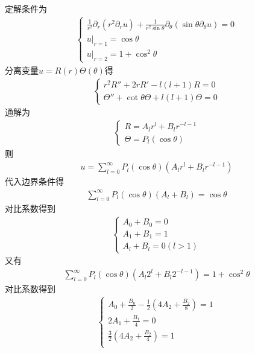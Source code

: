 \documentclass{phyasgn}
\begin{document}
\begin{sol}[5]
  定解条件为
  \begin{align*}
    \left\{\begin{matrix}
      \frac{1}{r^2}\partial_r(r^2\partial_r u)+\frac{1}{r^2\sin\theta}\partial_\theta(\sin\theta\partial_\theta u)=0\\
      u|_{r=1}=\cos\theta\\
      u|_{r=2}=1+\cos^2\theta
    \end{matrix}\right.
  \end{align*}
  分离变量$u=R(r)\Theta(\theta)$得
  \begin{align*}
    \left\{\begin{matrix}
      r^2R''+2rR'-l(l+1)R=0\\
      \Theta''+\cot\theta\Theta+l(l+1)\Theta=0
    \end{matrix}\right.
  \end{align*}
  通解为
  \begin{align*}
    \left\{\begin{matrix}
      R=A_lr^l+B_lr^{-l-1}\\
      \Theta=P_l(\cos\theta)
    \end{matrix}\right.
  \end{align*}
  则\begin{align*}
    u=\sum_{l=0}^{\infty}P_l(\cos\theta)(A_lr^l+B_lr^{-l-1})
  \end{align*}
  代入边界条件得
  \begin{align*}
    \sum_{l=0}^{\infty}P_l(\cos\theta)(A_l+B_l)=\cos\theta
  \end{align*}
  对比系数得到
  \begin{align*}
    \left\{\begin{matrix}
      A_0+B_0=0\\
    A_1+B_1=1\\
    A_l+B_l=0(l>1)
    \end{matrix}\right.
  \end{align*}
  又有
  \begin{align*}
    \sum_{l=0}^{\infty}P_l(\cos\theta)(A_l2^l+B_l2^{-l-1})=1+\cos^2\theta
  \end{align*}
  对比系数得到
  \begin{align*}
    \left\{\begin{matrix}
      A_0+\frac{B_0}{2}-\frac{1}{2}(4A_2+\frac{B_2}{8})=1\\
    2A_1+\frac{B_1}{4}=0\\
    \frac{3}{2}(4A_2+\frac{B_2}{4})=1\\

\end{matrix}
\end{align*}
\end{sol}
\end{document}
